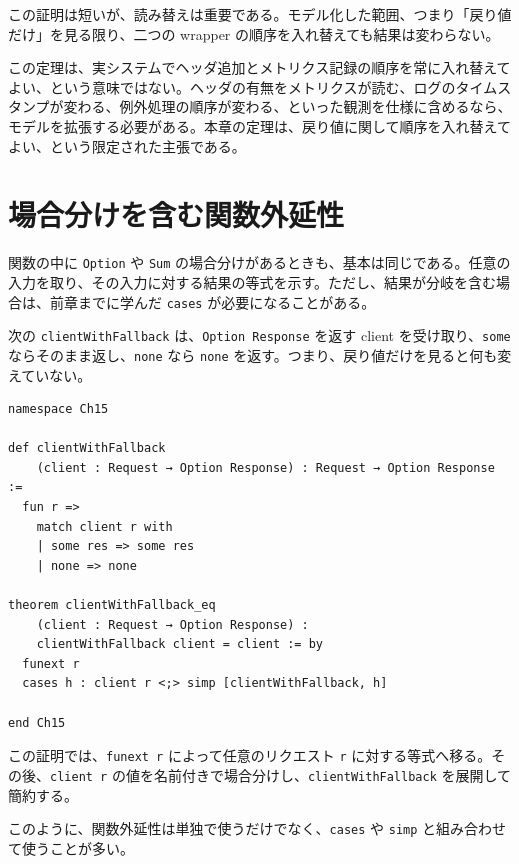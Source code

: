 この証明は短いが、読み替えは重要である。モデル化した範囲、つまり「戻り値だけ」を見る限り、二つの wrapper の順序を入れ替えても結果は変わらない。

\begin{warningbox}
この定理は、実システムでヘッダ追加とメトリクス記録の順序を常に入れ替えてよい、という意味ではない。ヘッダの有無をメトリクスが読む、ログのタイムスタンプが変わる、例外処理の順序が変わる、といった観測を仕様に含めるなら、モデルを拡張する必要がある。本章の定理は、戻り値に関して順序を入れ替えてよい、という限定された主張である。
\end{warningbox}

\section{場合分けを含む関数外延性}

関数の中に \texttt{Option} や \texttt{Sum} の場合分けがあるときも、基本は同じである。任意の入力を取り、その入力に対する結果の等式を示す。ただし、結果が分岐を含む場合は、前章までに学んだ \texttt{cases} が必要になることがある。

次の \texttt{clientWithFallback} は、\texttt{Option Response} を返す client を受け取り、\texttt{some} ならそのまま返し、\texttt{none} なら \texttt{none} を返す。つまり、戻り値だけを見ると何も変えていない。

\begin{listing}[htbp]
\begin{verbatim}
namespace Ch15

def clientWithFallback
    (client : Request → Option Response) : Request → Option Response :=
  fun r =>
    match client r with
    | some res => some res
    | none => none

theorem clientWithFallback_eq
    (client : Request → Option Response) :
    clientWithFallback client = client := by
  funext r
  cases h : client r <;> simp [clientWithFallback, h]

end Ch15
\end{verbatim}
\caption{場合分けを含む wrapper の等しさ}
\label{lst:ch15-option-wrapper}
\end{listing}

この証明では、\texttt{funext r} によって任意のリクエスト \texttt{r} に対する等式へ移る。その後、\texttt{client r} の値を名前付きで場合分けし、\texttt{clientWithFallback} を展開して簡約する。

このように、関数外延性は単独で使うだけでなく、\texttt{cases} や \texttt{simp} と組み合わせて使うことが多い。

